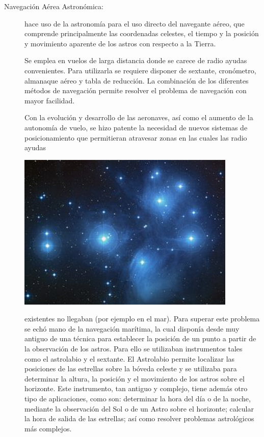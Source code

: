 \begin{description}


\item[Navegaci\'on A\'erea Astron\'omica:] hace uso de la astronom\'ia para el uso directo del navegante a\'ereo, que comprende principalmente las coordenadas celestes, el tiempo y la posici\'on y movimiento aparente de los astros con respecto a la Tierra.

  \begin{minipage}[b]{0.60\linewidth}
    Se emplea en vuelos de larga distancia donde se carece de radio
    ayudas convenientes. Para utilizarla se requiere disponer de
    sextante, cron\'ometro, almanaque a\'ereo y tabla de
    reducci\'on. La combinaci\'on de los diferentes m\'etodos de
    navegaci\'on permite resolver el problema de navegaci\'on con
    mayor facilidad.

Con la evoluci\'on y desarrollo de las aeronaves, as\'i como el aumento de la autonom\'ia de vuelo, se hizo patente la necesidad de nuevos sistemas de posicionamiento que permitieran atravesar  zonas en las cuales las radio ayudas
  \end{minipage}
  \begin{minipage}[b]{0.40\linewidth} \centering
    \includegraphics[width=0.85\textwidth]{Imagenes/06.00.navegacion/pleyades}
  \end{minipage}
 existentes no llegaban (por ejemplo en el mar). Para superar este problema se ech\'o mano de la navegaci\'on mar\'itima, la cual dispon\'ia desde muy antiguo de una t\'ecnica para establecer la posici\'on de un punto a partir de la observaci\'on de los astros. Para ello se utilizaban instrumentos tales como el astrolabio y el sextante. El Astrolabio permite localizar las posiciones de las estrellas sobre la b\'oveda celeste y se utilizaba para determinar la altura, la posici\'on y el movimiento de los astros sobre el horizonte. Este instrumento, tan antiguo y complejo, tiene adem\'as otro tipo de aplicaciones, como son: determinar la hora del d\'ia o de la noche, mediante la observaci\'on del Sol o de un Astro sobre el horizonte; calcular la hora de salida de las estrellas; as\'i como resolver problemas astrol\'ogicos m\'as complejos. 


\end{description}
